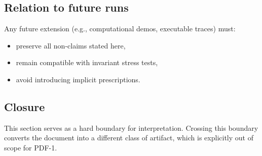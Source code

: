 \subsection{Relation to future runs}
Any future extension (e.g., computational demos, executable traces)
must:
\begin{itemize}
  \item preserve all non-claims stated here,
  \item remain compatible with invariant stress tests,
  \item avoid introducing implicit prescriptions.
\end{itemize}

\subsection{Closure}
This section serves as a hard boundary for interpretation.
Crossing this boundary converts the document into a different class of artifact,
which is explicitly out of scope for PDF-1.
